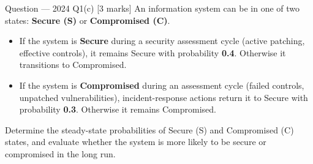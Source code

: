\documentclass[12pt,a4paper]{article}
\begin{document}
\begin{qbox}{Question --- 2024 Q1(c) \hfill [3 marks]}
An information system can be in one of two states: \textbf{Secure (S)} or \textbf{Compromised (C)}.
\begin{itemize}[noitemsep]
  \item If the system is \textbf{Secure} during a security assessment cycle (active patching, effective controls), it remains Secure with probability \textbf{0.4}. Otherwise it transitions to Compromised.
  \item If the system is \textbf{Compromised} during an assessment cycle (failed controls, unpatched vulnerabilities), incident-response actions return it to Secure with probability \textbf{0.3}. Otherwise it remains Compromised.
\end{itemize}
Determine the steady-state probabilities of Secure (S) and Compromised (C) states, and evaluate whether the system is more likely to be secure or compromised in the long run.
\end{qbox}
\end{document}
